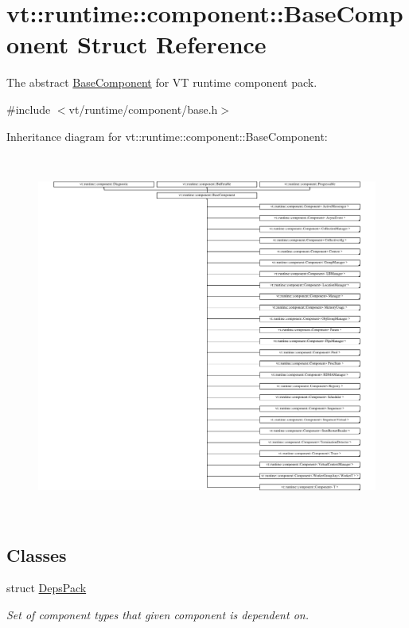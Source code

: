 \hypertarget{structvt_1_1runtime_1_1component_1_1_base_component}{}\section{vt\+:\+:runtime\+:\+:component\+:\+:Base\+Component Struct Reference}
\label{structvt_1_1runtime_1_1component_1_1_base_component}


The abstract {\ttfamily \hyperlink{structvt_1_1runtime_1_1component_1_1_base_component}{Base\+Component}} for VT runtime component pack.  




{\ttfamily \#include $<$vt/runtime/component/base.\+h$>$}

Inheritance diagram for vt\+:\+:runtime\+:\+:component\+:\+:Base\+Component\+:\begin{figure}[H]
\begin{center}
\leavevmode
\includegraphics[height=12.000000cm]{structvt_1_1runtime_1_1component_1_1_base_component}
\end{center}
\end{figure}
\subsection*{Classes}
\begin{DoxyCompactItemize}
\item 
struct \hyperlink{structvt_1_1runtime_1_1component_1_1_base_component_1_1_deps_pack}{Deps\+Pack}
\begin{DoxyCompactList}\small\item\em Set of component types that given component is dependent on. \end{DoxyCompactList}\end{DoxyCompactItemize}
